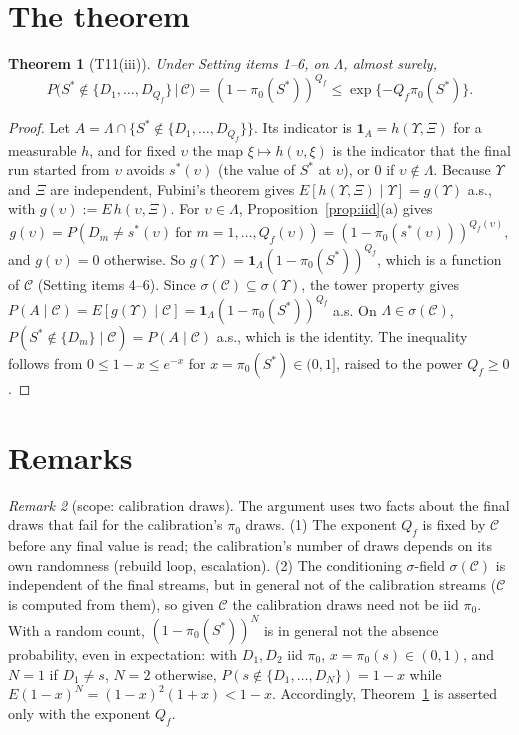 \documentclass[11pt]{article}
\newtheorem{theorem}{Theorem}
\theoremstyle{remark}
\newtheorem{remark}[theorem]{Remark}
\newcommand{\cC}{\mathcal{C}}
\newcommand{\1}{\mathbf{1}}
\begin{document}
\section{The theorem}

\begin{theorem}[T11(iii)]\label{thm:main}
Under Setting items 1--6, on $\Lambda$, almost surely,
\[
P\big(S^*\notin\{D_1,\dots,D_{Q_f}\}\,\big|\,\cC\big)=(1-\pi_0(S^*))^{Q_f}\le\exp\{-Q_f\pi_0(S^*)\}.
\]
\end{theorem}

\begin{proof}
Let $A=\Lambda\cap\{S^*\notin\{D_1,\dots,D_{Q_f}\}\}$. Its indicator is $\1_A=h(\Upsilon,\Xi)$ for a measurable $h$, and
for fixed $\upsilon$ the map $\xi\mapsto h(\upsilon,\xi)$ is the indicator that the final run started from $\upsilon$
avoids $s^*(\upsilon)$ (the value of $S^*$ at $\upsilon$), or $0$ if $\upsilon\notin\Lambda$. Because $\Upsilon$ and
$\Xi$ are independent, Fubini's theorem gives $E[h(\Upsilon,\Xi)\mid\Upsilon]=g(\Upsilon)$ a.s., with
$g(\upsilon):=E\,h(\upsilon,\Xi)$. For $\upsilon\in\Lambda$, Proposition~\ref{prop:iid}(a) gives
\[
g(\upsilon)=P(D_m\ne s^*(\upsilon)\ \text{for } m=1,\dots,Q_f(\upsilon))=(1-\pi_0(s^*(\upsilon)))^{Q_f(\upsilon)},
\]
and $g(\upsilon)=0$ otherwise. So $g(\Upsilon)=\1_\Lambda(1-\pi_0(S^*))^{Q_f}$, which is a function of $\cC$ (Setting
items 4--6). Since $\sigma(\cC)\subseteq\sigma(\Upsilon)$, the tower property gives
$P(A\mid\cC)=E[g(\Upsilon)\mid\cC]=\1_\Lambda(1-\pi_0(S^*))^{Q_f}$ a.s. On $\Lambda\in\sigma(\cC)$,
$P(S^*\notin\{D_m\}\mid\cC)=P(A\mid\cC)$ a.s., which is the identity. The inequality follows from
$0\le1-x\le e^{-x}$ for $x=\pi_0(S^*)\in(0,1]$, raised to the power $Q_f\ge0$.
\end{proof}

\section{Remarks}

\begin{remark}[scope: calibration draws]\label{rem:scope}
The argument uses two facts about the final draws that fail for the calibration's $\pi_0$ draws. (1) The exponent
$Q_f$ is fixed by $\cC$ before any final value is read; the calibration's number of draws depends on its own
randomness (rebuild loop, escalation). (2) The conditioning $\sigma$-field $\sigma(\cC)$ is independent of the final
streams, but in general not of the calibration streams ($\cC$ is computed from them), so given $\cC$ the calibration
draws need not be iid $\pi_0$. With a random count, $(1-\pi_0(S^*))^N$ is in general not the absence probability, even in expectation: with
$D_1,D_2$ iid $\pi_0$, $x=\pi_0(s)\in(0,1)$, and $N=1$ if $D_1\ne s$, $N=2$ otherwise,
$P(s\notin\{D_1,\dots,D_N\})=1-x$ while $E(1-x)^N=(1-x)^2(1+x)<1-x$. Accordingly, Theorem~\ref{thm:main} is asserted
only with the exponent $Q_f$.
\end{remark}
\end{document}
